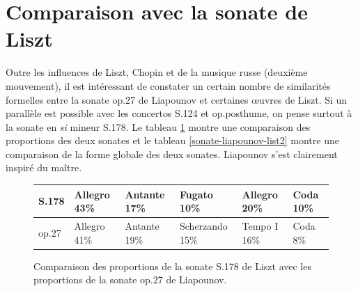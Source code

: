 \section{Comparaison avec la sonate de Liszt}

Outre les influences de Liszt, Chopin et de la musique russe (deuxième mouvement), il est intéressant de constater un certain nombre de similarités formelles entre la sonate op.27 de Liapounov et certaines œuvres de Liszt. Si un parallèle est possible avec les concertos S.124 et op.posthume, on pense surtout à la sonate en \emph{si} mineur S.178. Le tableau \ref{sonate-liapounov-list1} montre une comparaison des proportions des deux sonates et le tableau \ref{sonate-liapounov-list2} montre une comparaison de la forme globale des deux sonates. Liapounov s'est clairement inspiré du maître.

\begin{figure}[!ht]
  \begin{bigcenter}
    \scalebox{0.875} {
\begin{tabular}{|l||l|l|l|l|l|}
 \hline
S.178 & Allegro 43\% & Antante 17\% & Fugato 10\% & Allegro 20\% & Coda 10\%\\
 \hline
 \hline
op.27 & Allegro 41\% & Antante 19\% & Scherzando 15\% & Tempo I 16\% & Coda 8\%\\
 \hline
\end{tabular}
    }
  \end{bigcenter}
  \caption{\label{sonate-liapounov-list1}Comparaison des proportions de la sonate S.178 de Liszt avec les proportions de la sonate op.27 de Liapounov.}
\end{figure}

